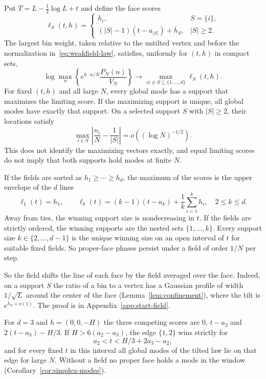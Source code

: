 \begin{theorem}\label{thm:weakfield-phases}
Put $T=L-\frac12\log L+t$ and define the face scores
\[
 \ell_S(t,h)=
 \begin{cases}
 h_i,& S=\{i\},\\
 (|S|-1)(t-a_{|S|})+\bar h_S,& |S|\ge2.
 \end{cases}
\]
The largest bin weight, taken relative to the untilted vertex and before the
normalization in~\eqref{eq:weakfield-law}, satisfies, uniformly for $(t,h)$ in
compact sets,
\begin{equation}\label{eq:weakfield-maximum}
 \log\max_n\left\{e^{h\cdot n/N}\frac{P_N(n)}{V_N}\right\}
 \longrightarrow \max_{\varnothing\ne S\subseteq\{1,\ldots,d\}}
 \ell_S(t,h).
\end{equation}
For fixed $(t,h)$ and all large $N$, every global mode has a support that
maximizes the limiting score. If the maximizing support is unique, all global
modes have exactly that support. On a selected support $S$ with $|S|\ge2$,
their locations satisfy
\[
 \max_{i\in S}\left|\frac{n_i}{N}-\frac1{|S|}\right|=o((\log N)^{-1/2}).
\]
This does not identify the maximizing vectors exactly, and equal limiting
scores do not imply that both supports hold modes at finite $N$.

If the fields are sorted as $h_1\ge\cdots\ge h_d$, the maximum of the scores is
the upper envelope of the $d$ lines
\begin{equation}\label{eq:weakfield-lines}
 \ell_1(t)=h_1,\qquad
 \ell_k(t)=(k-1)(t-a_k)+\frac1k\sum_{i=1}^k h_i,
 \quad 2\le k\le d.
\end{equation}
Away from ties, the winning support size is nondecreasing in $t$. If the fields
are strictly ordered, the winning supports are the nested sets
$\{1,\ldots,k\}$. Every support size $k\in\{2,\ldots,d-1\}$ is the unique
winning size on an open interval of $t$ for suitable fixed fields. So
proper-face phases persist under a field of order $1/N$ per step.
\end{theorem}

So the field shifts the line of each face by the field averaged over the face.
Indeed, on a support $S$ the ratio of a bin to a vertex has a Gaussian profile of
width $1/\sqrt L$ around the center of the face (Lemma~\ref{lem:confinement}),
where the tilt is $e^{\bar h_S+o(1)}$. The proof is in
Appendix~\ref{app:start-field}.

\begin{example}\label{ex:weakfield-triangle}
For $d=3$ and $h=(0,0,-H)$ the three competing scores are $0$, $t-a_2$ and
$2(t-a_3)-H/3$. If $H>6(a_2-a_3)$, the edge $\{1,2\}$ wins strictly for
\[
 a_2<t<H/3+2a_3-a_2,
\]
and for every fixed $t$ in this interval all global modes of the tilted law lie
on that edge for large $N$. Without a field no proper face holds a mode in the
window (Corollary~\ref{cor:simplex-modes}).
\end{example}


